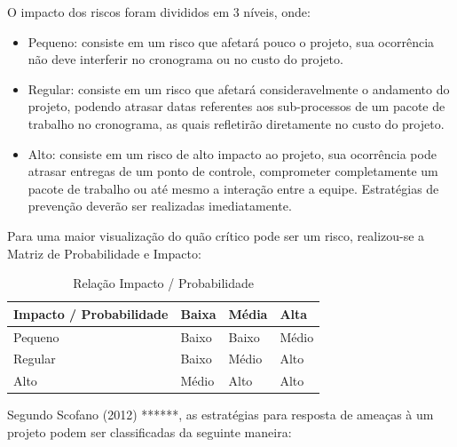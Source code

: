   O impacto dos riscos foram divididos em 3 níveis, onde:

  \begin{itemize}
    \item Pequeno: consiste em um risco que afetará pouco o projeto, sua ocorrência não deve interferir no cronograma ou no
    custo do projeto.
    \item Regular: consiste em um risco que afetará consideravelmente o andamento do projeto, podendo atrasar datas referentes
    aos sub-processos de um pacote de trabalho no cronograma, as quais refletirão diretamente no custo do projeto.
    \item Alto: consiste em um risco de alto impacto ao projeto, sua ocorrência pode atrasar entregas de um ponto de controle,
    comprometer completamente um pacote de trabalho ou até mesmo a interação entre a equipe. Estratégias de prevenção deverão
    ser realizadas imediatamente.
  \end{itemize}

  Para uma maior visualização do quão crítico pode ser um risco, realizou-se a Matriz de Probabilidade e Impacto:

  \begin{table}[!htbp]
    \begin{center}
    \caption{\label{impactoporprobabilidade}Relação Impacto / Probabilidade}
    \begin{tabular}{|l|l|l|l|}
    \hline
    \textbf{Impacto / Probabilidade} & \textbf{Baixa} & \textbf{Média} & \textbf{Alta} \\ \hline\hline
    Pequeno                          & Baixo          & Baixo          & Médio         \\ \hline
    Regular                          & Baixo          & Médio          & Alto          \\ \hline
    Alto                             & Médio          & Alto           & Alto          \\ \hline
    \end{tabular}
    \end{center}
  \end{table}

  Segundo Scofano (2012) ******, as estratégias para resposta de ameaças à um projeto podem ser classificadas da seguinte maneira:

